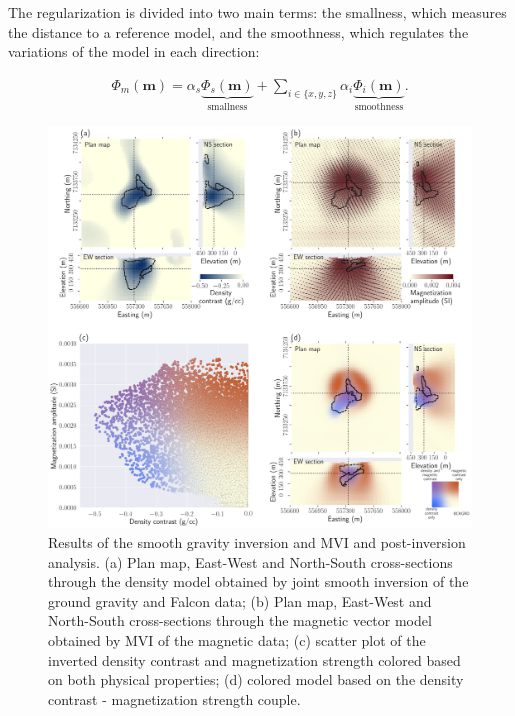 \documentclass[paper, twocolumn]{geophysics} %
\begin{document}
The regularization is divided into two main terms: the smallness, which measures the distance to a reference model, and the smoothness, which regulates the variations of the model in each direction:

\begin{align}
\Phi_{m}(\mathbf{m})= \alpha_s \underbrace{\Phi_{s}(\mathbf{m})}_{\text{smallness}} + \sum_{i\in{\{x,y,z\}}}\alpha_i\underbrace{\Phi_{i}(\mathbf{m})}_{\text{smoothness}}. \label{regularizer}
\end{align}


\begin{figure}
\centering
\includegraphics[width=\textwidth]{Figures/300dpi/Figure5.png}
\caption{Results of the smooth gravity inversion and MVI and post-inversion analysis. (a) Plan map, East-West and North-South cross-sections through the density model obtained by joint smooth inversion of the ground gravity and Falcon data; (b) Plan map, East-West and North-South cross-sections through the magnetic vector model obtained by MVI of the magnetic data; (c) scatter plot of the inverted density contrast and magnetization strength colored based on both physical properties; (d) colored model based on the density contrast - magnetization strength couple.}
\label{fig:Figure5.png}
\end{figure}
\end{document}
